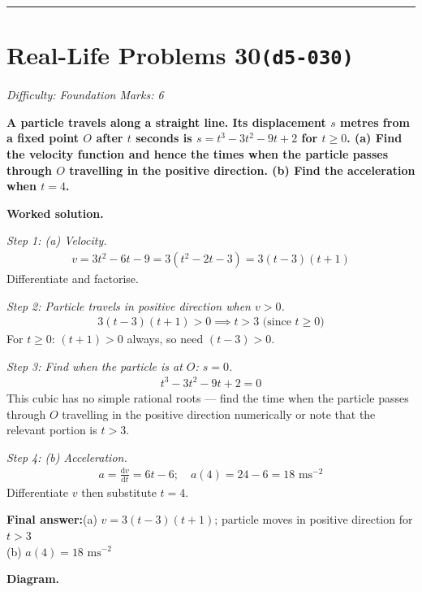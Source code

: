 \documentclass[11pt]{article}
\newcommand{\question}[1]{\par\medskip\noindent\textbf{#1}\par}
\begin{document}
\medskip\hrule

\section*{Real-Life Problems 30\quad\small\texttt{(d5-030)}}
\textit{Difficulty: Foundation \quad\textbar\quad Marks: 6}

\question{A particle travels along a straight line. Its displacement \( s \) metres from a fixed point \( O \) after \( t \) seconds is \( s = t^3 - 3t^2 - 9t + 2 \) for \( t \geq 0 \). (a) Find the velocity function and hence the times when the particle passes through \( O \) travelling in the positive direction. (b) Find the acceleration when \( t = 4 \).}

\textbf{Worked solution.}

\textit{Step 1: (a) Velocity.}
\[\begin{gathered}
v = 3t^2 - 6t - 9 = 3(t^2 - 2t - 3) = 3(t-3)(t+1)
\end{gathered}\]
Differentiate and factorise.

\textit{Step 2: Particle travels in positive direction when \( v > 0 \).}
\[\begin{gathered}
3(t-3)(t+1) > 0 \implies t > 3 \text{ (since } t \geq 0\text{)}
\end{gathered}\]
For \( t \geq 0 \): \( (t+1) > 0 \) always, so need \( (t-3) > 0 \).

\textit{Step 3: Find when the particle is at \( O \): \( s = 0 \).}
\[\begin{gathered}
t^3 - 3t^2 - 9t + 2 = 0
\end{gathered}\]
This cubic has no simple rational roots --- find the time when the particle passes through \( O \) travelling in the positive direction numerically or note that the relevant portion is \( t > 3 \).

\textit{Step 4: (b) Acceleration.}
\[\begin{gathered}
a = \frac{\mathrm{d}v}{\mathrm{d}t} = 6t - 6; \quad a(4) = 24 - 6 = 18 \text{ ms}^{-2}
\end{gathered}\]
Differentiate \( v \) then substitute \( t = 4 \).

\begin{answerbox}
\textbf{Final answer:}\quad (a) \(\displaystyle  v = 3(t-3)(t+1) \); particle moves in positive direction for \(\displaystyle  t > 3 \) \\[3pt]  (b) \(\displaystyle  a(4) = 18 \text{ ms}^{-2} \)
\end{answerbox}
\textbf{Diagram.}
\end{document}
